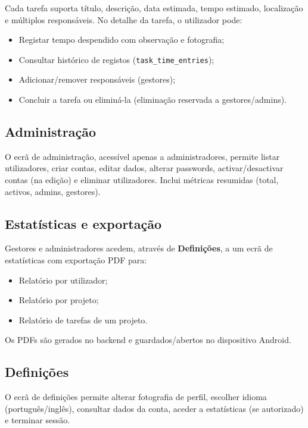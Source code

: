 \documentclass[12pt,a4paper]{article}
\begin{document}
Cada tarefa suporta título, descrição, data estimada, tempo estimado, localização e múltiplos responsáveis. No detalhe da tarefa, o utilizador pode:

\begin{itemize}[leftmargin=*]
    \item Registar tempo despendido com observação e fotografia;
    \item Consultar histórico de registos (\texttt{task\_time\_entries});
    \item Adicionar/remover responsáveis (gestores);
    \item Concluir a tarefa ou eliminá-la (eliminação reservada a gestores/admins).
\end{itemize}

\subsection{Administração}

O ecrã de administração, acessível apenas a administradores, permite listar utilizadores, criar contas, editar dados, alterar passwords, activar/desactivar contas (na edição) e eliminar utilizadores. Inclui métricas resumidas (total, activos, admins, gestores).

\subsection{Estatísticas e exportação}

Gestores e administradores acedem, através de \textbf{Definições}, a um ecrã de estatísticas com exportação PDF para:

\begin{itemize}[leftmargin=*]
    \item Relatório por utilizador;
    \item Relatório por projeto;
    \item Relatório de tarefas de um projeto.
\end{itemize}

Os PDFs são gerados no backend e guardados/abertos no dispositivo Android.

\subsection{Definições}

O ecrã de definições permite alterar fotografia de perfil, escolher idioma (português/inglês), consultar dados da conta, aceder a estatísticas (se autorizado) e terminar sessão.
\end{document}
